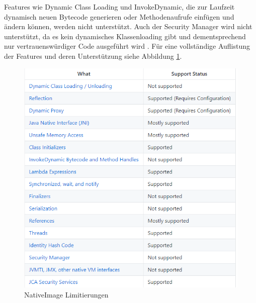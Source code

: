 Features wie Dynamic Class Loading und InvokeDynamic, die zur Laufzeit dynamisch neuen Bytecode generieren oder Methodenaufrufe einfügen und ändern können, werden nicht unterstützt.
Auch der Security Manager wird nicht unterstützt, da es kein dynamisches Klassenloading gibt und dementsprechend nur vertrauenswürdiger Code ausgeführt wird \parencite{GraalLimitiations}.
Für eine vollständige Auflistung der Features und deren Unterstützung siehe Abbildung \ref{fig:system_limitations}.
\newpage
\begin{figure}[h]
	\centering
	\includegraphics[width=1\textwidth]{resources/limitations.png}
	\caption{NativeImage Limitierungen \parencite{GraalLimitiations}}
	\label{fig:system_limitations}
\end{figure}
\newpage
